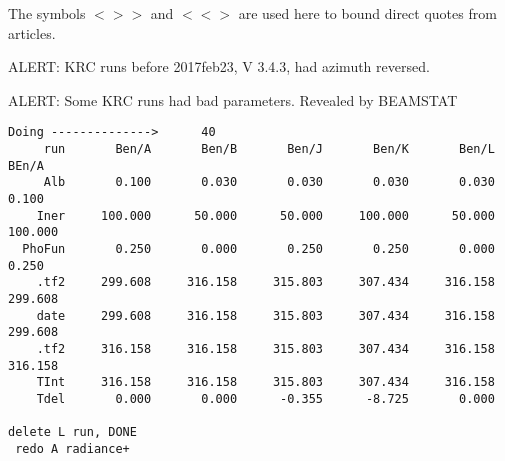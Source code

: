 \documentclass{article}
\newcommand{\bq}{$ < \! > \!   \! >$ } %
\newcommand{\eq}{ $< \! \! < \! > $ } %
\begin{document}
The symbols \bq and \eq  are used here to bound direct quotes from articles.

ALERT: KRC runs before 2017feb23, V 3.4.3, had azimuth reversed.

ALERT: Some KRC runs had bad parameters. Revealed by BEAMSTAT
\vspace{-3.mm} 
\begin{verbatim}
Doing -------------->      40
     run       Ben/A       Ben/B       Ben/J       Ben/K       Ben/L       BEn/A
     Alb       0.100       0.030       0.030       0.030       0.030       0.100
    Iner     100.000      50.000      50.000     100.000      50.000     100.000
  PhoFun       0.250       0.000       0.250       0.250       0.000       0.250
    .tf2     299.608     316.158     315.803     307.434     316.158     299.608
    date     299.608     316.158     315.803     307.434     316.158     299.608
    .tf2     316.158     316.158     315.803     307.434     316.158     316.158
    TInt     316.158     316.158     315.803     307.434     316.158
    Tdel       0.000       0.000      -0.355      -8.725       0.000

delete L run, DONE
 redo A radiance+  
\end{verbatim}  

\end{document}
